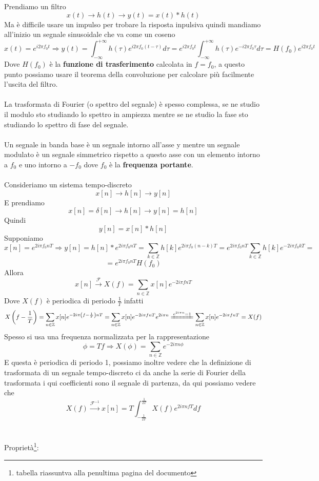 \documentclass{article}
\newcommand{\accapo}{\\\hspace*{1cm}\\}
\newcommand{\trasformata}{\xrightarrow{\mathscr{F}}}
\newcommand{\antitrasformata}{\xrightarrow{\mathscr{F}^{-1}}}
\begin{document}
Prendiamo un filtro
\[x(t)\to\boxed{h(t)}\to y(t)=x(t)*h(t)\]
Ma è difficile usare un impulso per trobare la risposta inpulsiva quindi mandiamo all'inizio un segnale sinusoidale che va come un coseno
\[x(t)=e^{i2\pi f_0 t}\Rightarrow y(t)=\int_{-\infty}^{+\infty}h(\tau)e^{i2\pi f_0(t-\tau)}d\tau=e^{i2\pi f_0 t}\int_{-\infty}^{+\infty}h(\tau)e^{-i2\pi f_0 \tau}d\tau=H(f_0)e^{i2\pi f_0 t}\]
Dove \(H(f_0)\) è la \textbf{funzione di trasferimento} calcolata in \(f=f_0\), a questo punto possiamo usare il teorema della convoluzione per calcolare più facilmente l'uscita del filtro.\accapo
La trasformata di Fourier (o spettro del segnale) è spesso complessa, se ne studio il modulo sto studiando lo spettro in ampiezza mentre se ne studio la fase sto studiando lo spettro di fase del segnale.\accapo
Un segnale in banda base è un segnale intorno all'asse y mentre un segnale modulato è un segnale simmetrico rispetto a questo asse con un elemento intorno a $f_0$ e uno intorno a $-f_0$ dove $f_0$ è la \textbf{frequenza portante}.\accapo
Consideriamo un sistema tempo-discreto
\[x[n]\to\boxed{h[n]}\to y[n]\]
E prendiamo
\[x[n]=\delta[n]\to\boxed{h[n]}\to y[n]=h[n]\]
Quindi
\[y[n]=x[n]*h[n]\]
Supponiamo
\[x[n]=e^{2i\pi f_0 nT}\Rightarrow y[n]=h[n]*e^{2i\pi f_0 nT}=\sum_{k\in\mathbb{Z}}h[k]e^{2i\pi f_0(n-k)T}=e^{2i\pi f_0 nT}\sum_{k\in\mathbb{Z}}h[k]e^{-2i\pi f_0 kT}=\]
\[=e^{2i\pi f_0 nT}H(f_0)\]
Allora
\LARGE\[x[n]\trasformata X(f)=\sum_{n\in\mathbb{Z}}x[n]e^{-2i\pi fnT}\]\normalsize
Dove \(X(f)\) è periodica di periodo \(\frac{1}{T}\) infatti
\[X\left(f-\frac{1}{T}\right)=\sum_{n\in\mathbb{Z}}x[n]e^{-2i\pi \left(f-\frac{1}{T}\right)nT}=\sum_{n\in\mathbb{Z}}x[n]e^{-2i\pi fnT}e^{2i\pi n}\xlongequal{e^{2i\pi n}=1}\sum_{n\in\mathbb{Z}}x[n]e^{-2i\pi fnT}=X(f)\]
Spesso si usa una frequenza normalizzata per la rappresentazione
\[\phi=Tf\Rightarrow X(\phi)=\sum_{n\in\mathbb{Z}}e^{-2i\pi n\phi}\]
E questa è periodica di periodo 1, possiamo inoltre vedere che la definizione di trasformata di un segnale tempo-discreto ci da anche la serie di Fourier della trasformata i qui coefficienti sono il segnale di partenza, da qui possiamo vedere che
\LARGE\[X(f)\antitrasformata x[n]=T\int_{-\frac{1}{2T}}^{\frac{1}{2T}}X(f)e^{2i\pi nfT}df\]\normalsize\accapo
Proprietà\footnote{tabella riassuntva alla penultima pagina del documento}:
\end{document}
